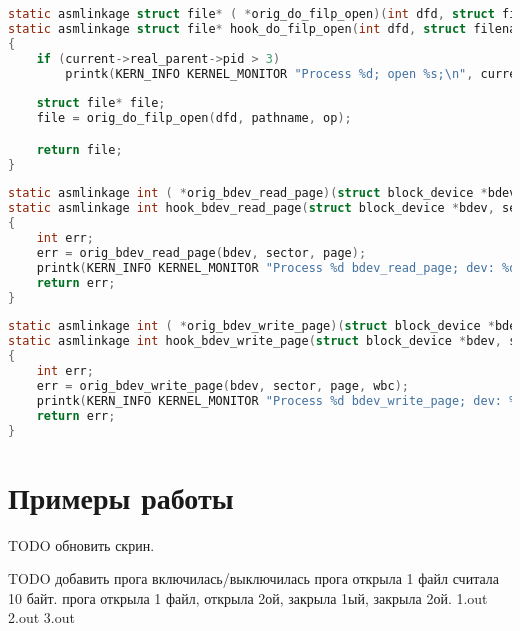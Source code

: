     \begin{lstlisting}[language=C, label=lst:ftrace-hooking:do_filp_open, caption=Функция-обёртка функции do\_filp\_open]
static asmlinkage struct file* ( *orig_do_filp_open)(int dfd, struct filename *pathname, const struct open_flags *op);
static asmlinkage struct file* hook_do_filp_open(int dfd, struct filename *pathname, const struct open_flags *op)
{
    if (current->real_parent->pid > 3)
        printk(KERN_INFO KERNEL_MONITOR "Process %d; open %s;\n", current->pid, pathname->name);
    
    struct file* file;
    file = orig_do_filp_open(dfd, pathname, op);

    return file;
}
    \end{lstlisting}


    \begin{lstlisting}[language=C, label=lst:ftrace-hooking:bdev_read_page, caption=Функция-обёртка функции bdev\_read\_page]
static asmlinkage int ( *orig_bdev_read_page)(struct block_device *bdev, sector_t sector, struct page *page);
static asmlinkage int hook_bdev_read_page(struct block_device *bdev, sector_t sector, struct page *page)
{
    int err;
    err = orig_bdev_read_page(bdev, sector, page);
    printk(KERN_INFO KERNEL_MONITOR "Process %d bdev_read_page; dev: %d\n", current->pid, bdev->bd_dev);
    return err;
}
    \end{lstlisting}

    \begin{lstlisting}[language=C, label=lst:ftrace-hooking:bdev_write_page, caption=Функция-обёртка функции bdev\_write\_page]
static asmlinkage int ( *orig_bdev_write_page)(struct block_device *bdev, sector_t sector, struct page *page, struct writeback_control *wbc);
static asmlinkage int hook_bdev_write_page(struct block_device *bdev, sector_t sector, struct page *page, struct writeback_control *wbc)
{
    int err;
    err = orig_bdev_write_page(bdev, sector, page, wbc);
    printk(KERN_INFO KERNEL_MONITOR "Process %d bdev_write_page; dev: %d\n", current->pid, bdev->bd_dev);
    return err;
}
    \end{lstlisting}

\section{Примеры работы}

    TODO обновить скрин.
    
    TODO добавить
    прога включилась/выключилась
    прога открыла 1 файл считала 10 байт.
    прога открыла 1 файл, открыла 2ой, закрыла 1ый, закрыла 2ой. 
    1.out
    2.out
    3.out



